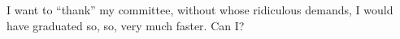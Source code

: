 I want to ``thank'' my committee, without whose ridiculous demands, I
would have graduated so, so, very much faster.
Can I?
